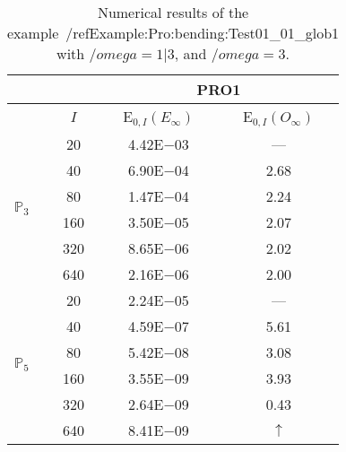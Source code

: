 \begin{table}[H]
\caption{Numerical results of the example~/ref{Example:Pro:bending:Test01_01_glob1} with $/omega=1|3$, and $/omega=3$.}
\setlength{\tabcolsep}{5pt}
\centering
\begin{tabular}{@{}l c c c@{}}
\toprule
 &  & \multicolumn{2}{c}{PRO1}\\
\midrule
 & $I$ & E$_{0,I}(E_{\infty})$ & E$_{0,I}(O_{\infty})$\\
\midrule
\multirow{6}{*}{$\mathbb{P}_{3}$}
 & 20 & 4.42E$-$03 & ---\\
 & 40 & 6.90E$-$04 & 2.68\\
 & 80 & 1.47E$-$04 & 2.24\\
 & 160 & 3.50E$-$05 & 2.07\\
 & 320 & 8.65E$-$06 & 2.02\\
 & 640 & 2.16E$-$06 & 2.00\\
\midrule
\multirow{6}{*}{$\mathbb{P}_{5}$}
 & 20 & 2.24E$-$05 & ---\\
 & 40 & 4.59E$-$07 & 5.61\\
 & 80 & 5.42E$-$08 & 3.08\\
 & 160 & 3.55E$-$09 & 3.93\\
 & 320 & 2.64E$-$09 & 0.43\\
 & 640 & 8.41E$-$09 & $\uparrow$\\
\bottomrule
\end{tabular}
\label{Table:PRO:test_01_01_test29_pro1}
\end{table}
